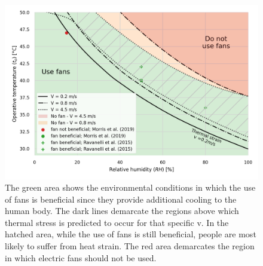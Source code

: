 \begin{figure}[thb!]
    \centering
    \includegraphics[width=\textwidth]{figures/summary_use_fans_comparison_experimental}
    \caption{The green area shows the environmental conditions in which the use of fans is beneficial since they provide additional cooling to the human body.
    The dark lines demarcate the regions above which thermal stress is predicted to occur for that specific \ac{v}.
    In the hatched area, while the use of fans is still beneficial, people are most likely to suffer from heat strain.
    The red area demarcates the region in which electric fans should not be used.
    }
    \label{fig:use_fans_experimental}
\end{figure}



